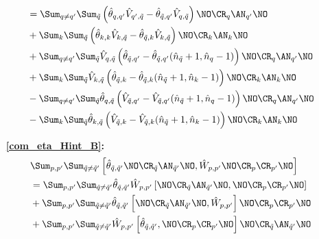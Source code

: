 \begin{appendix}
\begin{itemize}
\begin{align}
&=\Sum_{q\neq q^\prime}\Sum_{\tilde q} \left(\hat\theta_{q,q^\prime}\hat V_{q^\prime,\tilde q}-\hat\theta_{\tilde q,q^\prime}\hat V_{q,\tilde q}\right)\NO\CR_{q}\AN_{q^\prime}\NO \\
&+\Sum_{k}\Sum_{\tilde q} \left(\hat\theta_{k,k}\hat V_{k,\tilde q}-\hat\theta_{\tilde q,k}\hat V_{k,\tilde q}\right)\NO\CR_{k}\AN_{k}\NO \nonumber \\
&+\Sum_{q\neq q^\prime}\Sum_{\tilde q} \hat V_{q,\tilde q}\left(\hat\theta_{\tilde q,q^\prime}-\hat\theta_{\tilde q,q^\prime}(\hat n_{\tilde q}+1,\hat n_q-1)\right)\NO\CR_{q}\AN_{q^\prime}\NO\nonumber \\
&+\Sum_{k}\Sum_{\tilde q} \hat V_{k,\tilde q}\left(\hat\theta_{\tilde q,k}-\hat\theta_{\tilde q,k}(\hat n_{\tilde q}+1,\hat n_k-1)\right)\NO\CR_{k}\AN_{k}\NO\nonumber \\
&-\Sum_{q\neq q^\prime}\Sum_{\tilde q} \hat \theta_{q,\tilde q}\left(\hat V_{\tilde q,q^\prime}-\hat V_{\tilde q,q^\prime}(\hat n_{\tilde q}+1,\hat n_q-1)\right)\NO\CR_{q}\AN_{q^\prime}\NO\nonumber \\
&-\Sum_{k}\Sum_{\tilde q} \hat \theta_{k,\tilde q}\left(\hat V_{\tilde q,k}-\hat V_{\tilde q,k}(\hat n_{\tilde q}+1,\hat n_k-1)\right)\NO\CR_{k}\AN_{k}\NO\nonumber
\end{align}
\item[\textbf{\ref{com_eta_Hint_B}:}]
\begin{subequations}
\begin{align}
&\Sum_{p, p^\prime}\Sum_{\tilde q\neq\tilde q^\prime} \left[\hat\theta_{\tilde q,\tilde q^\prime}\NO\CR_{\tilde q}\AN_{\tilde q^\prime}\NO,\hat W_{p,p^\prime}\NO\CR_p\CR_{p^\prime}\NO\right]\nonumber \\
&=\Sum_{p, p^\prime}\Sum_{\tilde q\neq\tilde q^\prime} \hat\theta_{\tilde q,\tilde q^\prime}\hat W_{p,p^\prime}\left[\NO\CR_{\tilde q}\AN_{\tilde q^\prime}\NO,\NO\CR_p\CR_{p^\prime}\NO\right]\label{com_eta_Hint_B1}\\
&+\Sum_{p, p^\prime}\Sum_{\tilde q\neq\tilde q^\prime} \hat\theta_{\tilde q,\tilde q^\prime}\left[\NO\CR_{\tilde q}\AN_{\tilde q^\prime}\NO,\hat W_{p,p^\prime}\right]\NO\CR_p\CR_{p^\prime}\label{com_eta_Hint_B2}\NO\\
&+\Sum_{p, p^\prime}\Sum_{\tilde q\neq\tilde q^\prime} \hat W_{p,p^\prime}\left[\hat\theta_{\tilde q,\tilde q^\prime},\NO\CR_p\CR_{p^\prime}\NO\right]\NO\CR_{\tilde q}\AN_{\tilde q^\prime}\label{com_eta_Hint_B3}\NO

\end{align}
\end{subequations}
\end{itemize}
\end{appendix}
